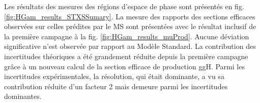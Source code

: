 Les résultats des mesures des régions d'espace de phase sont présentés en fig. \ref{fig:HGam_results_STXSSumary}.
La mesure des rapports des sections efficaces observées sur celles prédites par le MS sont présentées avec le résultat inclusif de la première campagne à la fig. \ref{fig:HGam_results_muProd}.
Aucune déviation significative n'est observée par rapport au Modèle Standard.
La contribution des incertitudes théoriques a été grandement réduite depuis la première campagne grâce à un nouveau calcul de la section efficace de production ggH.
Parmi les incertitudes expérimentales, la résolution, qui était dominante, a vu sa contribution réduite d'un facteur 2 mais demeure parmi les incertitudes dominantes.
